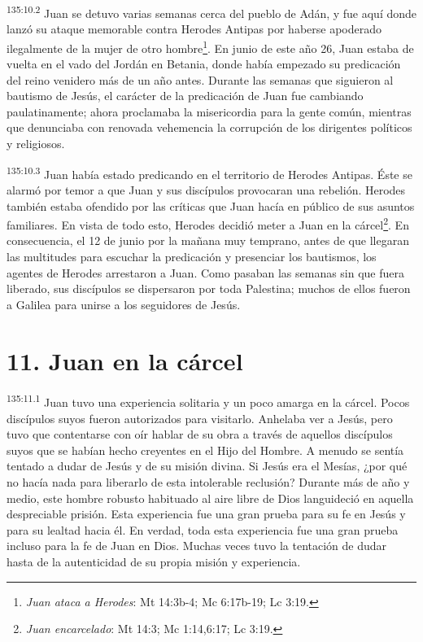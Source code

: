 \par
\textsuperscript{135:10.2} Juan se detuvo varias semanas cerca del pueblo de Adán, y fue aquí donde lanzó su ataque memorable contra Herodes Antipas por haberse apoderado ilegalmente de la mujer de otro hombre\footnote{\textit{Juan ataca a Herodes}: Mt 14:3b-4; Mc 6:17b-19; Lc 3:19.}. En junio de este año 26, Juan estaba de vuelta en el vado del Jordán en Betania, donde había empezado su predicación del reino venidero más de un año antes. Durante las semanas que siguieron al bautismo de Jesús, el carácter de la predicación de Juan fue cambiando paulatinamente; ahora proclamaba la misericordia para la gente común, mientras que denunciaba con renovada vehemencia la corrupción de los dirigentes políticos y religiosos.

\par
\textsuperscript{135:10.3} Juan había estado predicando en el territorio de Herodes Antipas. Éste se alarmó por temor a que Juan y sus discípulos provocaran una rebelión. Herodes también estaba ofendido por las críticas que Juan hacía en público de sus asuntos familiares. En vista de todo esto, Herodes decidió meter a Juan en la cárcel\footnote{\textit{Juan encarcelado}: Mt 14:3; Mc 1:14,6:17; Lc 3:19.}. En consecuencia, el 12 de junio por la mañana muy temprano, antes de que llegaran las multitudes para escuchar la predicación y presenciar los bautismos, los agentes de Herodes arrestaron a Juan. Como pasaban las semanas sin que fuera liberado, sus discípulos se dispersaron por toda Palestina; muchos de ellos fueron a Galilea para unirse a los seguidores de Jesús.

\section*{11. Juan en la cárcel}
\par
\textsuperscript{135:11.1} Juan tuvo una experiencia solitaria y un poco amarga en la cárcel. Pocos discípulos suyos fueron autorizados para visitarlo. Anhelaba ver a Jesús, pero tuvo que contentarse con oír hablar de su obra a través de aquellos discípulos suyos que se habían hecho creyentes en el Hijo del Hombre. A menudo se sentía tentado a dudar de Jesús y de su misión divina. Si Jesús era el Mesías, ¿por qué no hacía nada para liberarlo de esta intolerable reclusión? Durante más de año y medio, este hombre robusto habituado al aire libre de Dios languideció en aquella despreciable prisión. Esta experiencia fue una gran prueba para su fe en Jesús y para su lealtad hacia él. En verdad, toda esta experiencia fue una gran prueba incluso para la fe de Juan en Dios. Muchas veces tuvo la tentación de dudar hasta de la autenticidad de su propia misión y experiencia.

